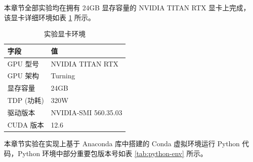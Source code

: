 本章节全部实验均在拥有 24GB 显存容量的 NVIDIA TITAN RTX 显卡上完成，该显卡详细环境如表 \ref{tab:gpu-env} 所示。

\begin{table}[htbp]
\centering
\caption{实验显卡环境} \label{tab:gpu-env}
\begin{tabular}{ll}
\toprule
\textbf{字段} & \textbf{值}           \\ \midrule
GPU   型号    & NVIDIA TITAN RTX     \\
GPU   架构    & Turning              \\
显存容量        & 24GB                 \\
TDP   (功耗)  & 320W                 \\
驱动版本        & NVIDIA-SMI 560.35.03 \\
CUDA   版本   & 12.6                 \\ \bottomrule
\end{tabular}
\end{table}

本章节实验在实现上基于 Anaconda 库中搭建的 Conda 虚拟环境运行 Python 代码，Python 环境中部分重要包版本号如表 \ref{tab:python-env} 所示。

